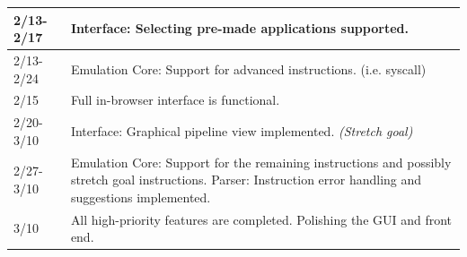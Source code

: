 \documentclass[
    paper=letter,
    parskip=half,
    fontsize=12pt,
    titlepage=firstiscover,
    toc=bibliography,
    numbers=endperiod
]{scrartcl}
\begin{document}
{\begin{tabularx}{\textwidth}{|l|X|}
        2/13-2/17     & Interface: Selecting pre-made applications supported.                                                                                                                                                                                                                                                                                                                                                                                \\\hline
        2/13-2/24     & Emulation Core: Support for advanced instructions. (i.e. syscall)                                                                                                                                                                                                                                                                                                                                                                    \\\hline
        2/15          & Full in-browser interface is functional.                                                                                                                                                                                                                                                                                                                                                                                             \\\hline
        2/20-3/10     & Interface: Graphical pipeline view implemented. \emph{(Stretch goal)}                                                                                                                                                                                                                                                                                                                                                                \\\hline
        2/27-3/10     & Emulation Core: Support for the remaining instructions and possibly stretch goal instructions. \newline Parser: Instruction error handling and suggestions implemented.                                                                                                                                                                                                                                                              \\\hline
        3/10          & All high-priority features are completed. Polishing the GUI and front end.                                                                                                                                                                                                                                                                                                                                                           \\\hline

\end{tabularx}}
\end{document}
